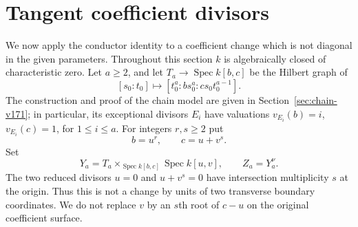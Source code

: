 \documentclass[11pt,reqno]{amsart}
\numberwithin{equation}{section}
\theoremstyle{definition}\newtheorem{definition}[theorem]{Definition}
\theoremstyle{remark}\newtheorem{remark}[theorem]{Remark}
\DeclareMathOperator{\Spec}{Spec}\DeclareMathOperator{\PGL}{PGL}
\begin{document}
\section{Tangent coefficient divisors}
\label{sec:tangent-v171}
We now apply the conductor identity to a coefficient change which is
not diagonal in the given parameters. Throughout this section $k$ is
algebraically closed of characteristic zero. Let $a\geq2$, and let
$T_a\to\Spec k[b,c]$ be the Hilbert graph of
\[
 [s_0:t_0]\longmapsto[t_0^a:b s_0^a:cs_0t_0^{a-1}].
\]
The construction and proof of the chain model are given in
Section~\ref{sec:chain-v171}; in particular, its exceptional divisors
$E_i$ have valuations $v_{E_i}(b)=i$, $v_{E_i}(c)=1$, for $1\leq i\leq a$.
For integers $r,s\geq2$ put
\begin{equation}\label{eq:tangent-cover-v171}
 b=u^r,\qquad c=u+v^s.
\end{equation}
Set
\[
 Y_a=T_a\times_{\Spec k[b,c]}\Spec k[u,v],\qquad Z_a=Y_a^\nu.
\]
The two reduced divisors $u=0$ and $u+v^s=0$ have intersection
multiplicity $s$ at the origin. Thus this is not a change by units of
two transverse boundary coordinates. We do not replace $v$ by an
$s$th root of $c-u$ on the original coefficient surface.
\end{document}

